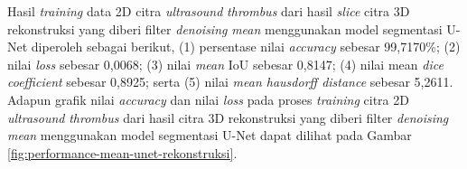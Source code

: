 \begin{enumerate}
	
	Hasil \textit{training} data 2D citra \textit{ultrasound} \textit{thrombus} dari hasil \textit{slice} citra 3D rekonstruksi yang diberi filter \textit{denoising} \textit{mean} menggunakan model segmentasi U-Net diperoleh sebagai berikut, (1) persentase nilai \textit{accuracy} sebesar 99,7170\%; (2) nilai \textit{loss} sebesar 0,0068; (3) nilai \textit{mean} IoU sebesar 0,8147; (4) nilai mean \textit{dice coefficient} sebesar 0,8925; serta (5) nilai \textit{mean hausdorff distance} sebesar 5,2611. Adapun grafik nilai \textit{accuracy} dan nilai \textit{loss} pada proses \textit{training} citra 2D \textit{ultrasound} \textit{thrombus} dari hasil citra 3D rekonstruksi yang diberi filter \textit{denoising} \textit{mean} menggunakan model segmentasi U-Net dapat dilihat pada Gambar \ref{fig:performance-mean-unet-rekonstruksi}.
	

\end{enumerate}
